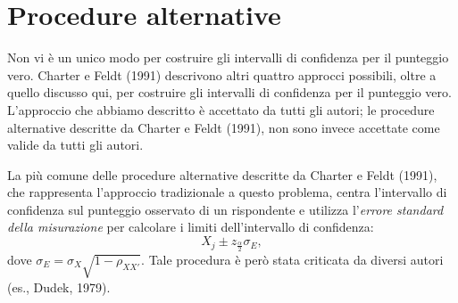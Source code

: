\section{Procedure alternative}

Non vi è un unico modo per costruire gli intervalli di confidenza per il punteggio vero. Charter e Feldt (1991) descrivono altri quattro approcci possibili, oltre a quello discusso qui, per costruire gli intervalli di confidenza per il punteggio vero. L'approccio che abbiamo descritto è accettato da tutti gli autori; le procedure alternative descritte da Charter e Feldt (1991),  non sono invece accettate come valide da tutti gli autori. 

La più comune delle procedure alternative descritte da Charter e Feldt (1991), che rappresenta l'approccio tradizionale a questo problema, centra l'intervallo di confidenza sul punteggio osservato di un rispondente e utilizza l'\textit{errore standard della misurazione} per calcolare i limiti dell'intervallo di confidenza:
\[
X_j \pm z_{\frac{\alpha}{2}} \sigma_E,
\]
dove $\sigma_E = \sigma_X \sqrt{1 -\rho_{XX'}}$. Tale procedura è però stata criticata da diversi autori (es., Dudek, 1979).


%
%





